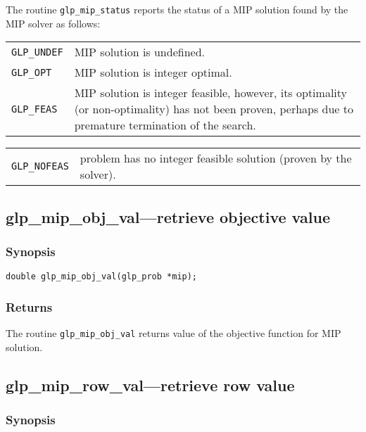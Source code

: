 The routine \verb|glp_mip_status| reports the status of a MIP solution
found by the MIP solver as follows:

\smallskip

\begin{tabular}{@{}p{25mm}p{91.3mm}@{}}
\verb|GLP_UNDEF| & MIP solution is undefined. \\
\verb|GLP_OPT|   & MIP solution is integer optimal. \\
\verb|GLP_FEAS|  & MIP solution is integer feasible, however, its
   optimality (or non-optimality) has not been proven, perhaps due to
   premature termination of the search. \\
\end{tabular}

\begin{tabular}{@{}p{25mm}p{91.3mm}@{}}
\verb|GLP_NOFEAS| & problem has no integer feasible solution (proven by
   the solver). \\
\end{tabular}


\subsection{glp\_mip\_obj\_val---retrieve objective value}

\subsubsection*{Synopsis}

\begin{verbatim}
double glp_mip_obj_val(glp_prob *mip);
\end{verbatim}

\subsubsection*{Returns}

The routine \verb|glp_mip_obj_val| returns value of the objective
function for MIP solution.

\subsection{glp\_mip\_row\_val---retrieve row value}

\subsubsection*{Synopsis}

